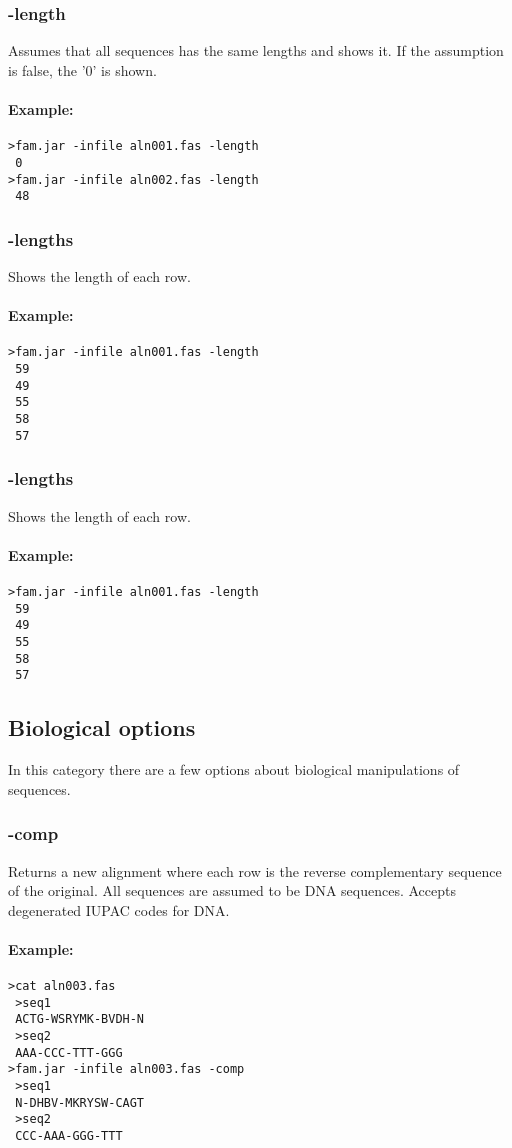 \documentclass[a4paper, twoside,10pt]{article}
\begin{document}
\subsubsection{-length}
Assumes that all sequences has the same lengths and shows it. If the assumption
is false, the '0' is shown.   
\paragraph{Example:}
\begin{verbatim}
>fam.jar -infile aln001.fas -length
 0
>fam.jar -infile aln002.fas -length
 48
\end{verbatim}

\subsubsection{-lengths}
Shows the length of each row. 
\paragraph{Example:}
\begin{verbatim}
>fam.jar -infile aln001.fas -length
 59
 49
 55
 58
 57
\end{verbatim}

\subsubsection{-lengths}
Shows the length of each row. 
\paragraph{Example:}
\begin{verbatim}
>fam.jar -infile aln001.fas -length
 59
 49
 55
 58
 57
\end{verbatim}

\subsection{Biological options}
In this category there are a few options about biological manipulations of 
sequences.
\subsubsection{-comp}
Returns a new alignment where each row is the reverse complementary sequence of
the original. All sequences are assumed to be DNA sequences. Accepts degenerated
IUPAC codes for DNA.
\paragraph{Example:}
\begin{verbatim}
>cat aln003.fas
 >seq1
 ACTG-WSRYMK-BVDH-N
 >seq2
 AAA-CCC-TTT-GGG
>fam.jar -infile aln003.fas -comp
 >seq1
 N-DHBV-MKRYSW-CAGT
 >seq2
 CCC-AAA-GGG-TTT
\end{verbatim}
\end{document}
